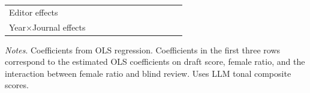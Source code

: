 \begin{table}
\begin{threeparttable}
\begin{tabular}{p{3cm}S@{}S@{}S@{}S@{}S@{}S@{}S@{}S@{}S@{}S@{}S@{}}
            \midrule
            Editor effects        &           {}   &           {}   &           {}   &           {}   &           {}   &           {}   &           {}   &           {}   &           {}   &           {}   &           {}   \\
            Year\(\times\)Journal effects          &           {}   &           {}   &           {}   &           {}   &           {}   &           {}   &           {}   &           {}   &           {}   &           {}   &           {}   \\
            \bottomrule
        \end{tabular}
        \begin{tablenotes}
            \tiny
            \item \textit{Notes}. Coefficients from OLS regression. Coefficients in the first three rows correspond to the estimated OLS coefficients on draft score, female ratio, and the interaction between female ratio and blind review. Uses LLM tonal composite scores.
        \end{tablenotes}
    \end{threeparttable}
\end{table}